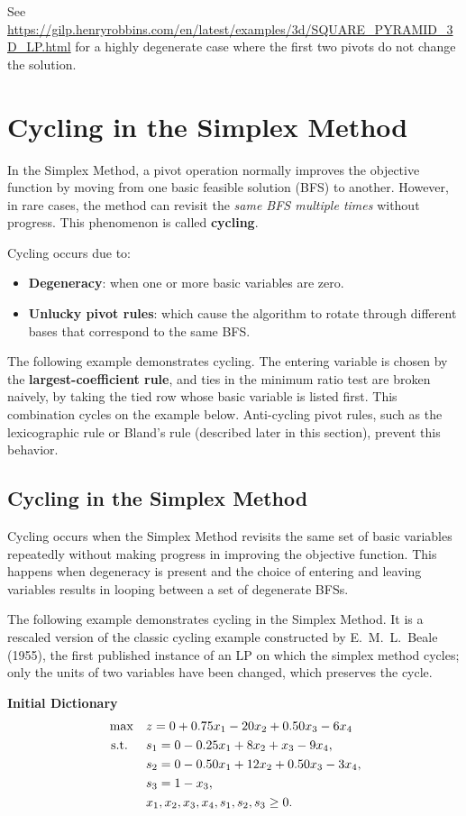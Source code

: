 See \url{https://gilp.henryrobbins.com/en/latest/examples/3d/SQUARE_PYRAMID_3D_LP.html} for a highly degenerate case where the first two pivots do not change the solution.

\section{Cycling in the Simplex Method}

In the Simplex Method, a pivot operation normally improves the objective function by moving from one basic feasible solution (BFS) to another. However, in rare cases, the method can revisit the \emph{same BFS multiple times} without progress. This phenomenon is called \textbf{cycling}.

Cycling occurs due to:
\begin{itemize}
  \item \textbf{Degeneracy}: when one or more basic variables are zero.
  \item \textbf{Unlucky pivot rules}: which cause the algorithm to rotate through different bases that correspond to the same BFS.
\end{itemize}

The following example demonstrates cycling. The entering variable is chosen by the \textbf{largest-coefficient rule}, and ties in the minimum ratio test are broken naively, by taking the tied row whose basic variable is listed first. This combination cycles on the example below. Anti-cycling pivot rules, such as the lexicographic rule or Bland's rule (described later in this section), prevent this behavior.

\subsection{Cycling in the Simplex Method}
Cycling occurs when the Simplex Method revisits the same set of basic variables repeatedly without making progress in improving the objective function. This happens when degeneracy is present and the choice of entering and leaving variables results in looping between a set of degenerate BFSs.

The following example demonstrates cycling in the Simplex Method.  It is a rescaled version of the classic cycling example constructed by E.~M.~L.~Beale (1955), the first published instance of an LP on which the simplex method cycles; only the units of two variables have been changed, which preserves the cycle.

\textbf{Initial Dictionary}
\[
\begin{aligned}
\max \quad & z = 0 + 0.75x_1 - 20x_2 + 0.50x_3 - 6x_4 \\
\text{ s.t. } \quad 
& s_1 = 0 - 0.25x_1 + 8x_2 + x_3 - 9x_4, \\
& s_2 = 0 - 0.50x_1 + 12x_2 + 0.50x_3 - 3x_4, \\
& s_3 = 1 - x_3, \\
& x_1, x_2, x_3, x_4, s_1, s_2, s_3 \geq 0.
\end{aligned}
\]

